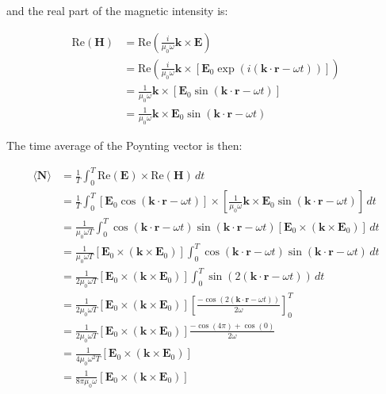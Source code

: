 \documentclass{article}
\begin{document}
and the real part of the magnetic intensity is:

\begin{align*}
\text{Re}(\mathbf{H}) &= \text{Re} \left( \frac{i}{\mu_0 \omega} \mathbf{k} \times \mathbf{E} \right) \\
&= \text{Re} \left( \frac{i}{\mu_0 \omega} \mathbf{k} \times [\mathbf{E}_0 \exp(i (\mathbf{k} \cdot \mathbf{r} - \omega t))] \right) \\
&= \frac{1}{\mu_0 \omega} \mathbf{k} \times [\mathbf{E}_0 \sin(\mathbf{k} \cdot \mathbf{r} - \omega t)] \\
&= \frac{1}{\mu_0 \omega} \mathbf{k} \times \mathbf{E}_0 \sin(\mathbf{k} \cdot \mathbf{r} - \omega t)
\end{align*}

The time average of the Poynting vector is then:

\begin{align*}
\langle \mathbf{N} \rangle &= \frac{1}{T} \int_0^T \text{Re}(\mathbf{E}) \times \text{Re}(\mathbf{H}) \, dt \\
&= \frac{1}{T} \int_0^T [\mathbf{E}_0 \cos(\mathbf{k} \cdot \mathbf{r} - \omega t)] \times \left[ \frac{1}{\mu_0 \omega} \mathbf{k} \times \mathbf{E}_0 \sin(\mathbf{k} \cdot \mathbf{r} - \omega t) \right] \, dt \\
&= \frac{1}{\mu_0 \omega T} \int_0^T \cos(\mathbf{k} \cdot \mathbf{r} - \omega t) \sin(\mathbf{k} \cdot \mathbf{r} - \omega t) [\mathbf{E}_0 \times (\mathbf{k} \times \mathbf{E}_0)] \, dt \\
&= \frac{1}{\mu_0 \omega T} [\mathbf{E}_0 \times (\mathbf{k} \times \mathbf{E}_0)] \int_0^T \cos(\mathbf{k} \cdot \mathbf{r} - \omega t) \sin(\mathbf{k} \cdot \mathbf{r} - \omega t) \, dt \\
&= \frac{1}{2 \mu_0 \omega T} [\mathbf{E}_0 \times (\mathbf{k} \times \mathbf{E}_0)] \int_0^T \sin(2 (\mathbf{k} \cdot \mathbf{r} - \omega t)) \, dt \\
&= \frac{1}{2 \mu_0 \omega T} [\mathbf{E}_0 \times (\mathbf{k} \times \mathbf{E}_0)] \left[ \frac{-\cos(2 (\mathbf{k} \cdot \mathbf{r} - \omega t))}{2 \omega} \right]_0^T \\
&= \frac{1}{2 \mu_0 \omega T} [\mathbf{E}_0 \times (\mathbf{k} \times \mathbf{E}_0)] \frac{-\cos(4 \pi) + \cos(0)}{2 \omega} \\
&= \frac{1}{4 \mu_0 \omega^2 T} [\mathbf{E}_0 \times (\mathbf{k} \times \mathbf{E}_0)] \\
&= \frac{1}{8 \pi \mu_0 \omega} [\mathbf{E}_0 \times (\mathbf{k} \times \mathbf{E}_0)]
\end{align*}
\end{document}
